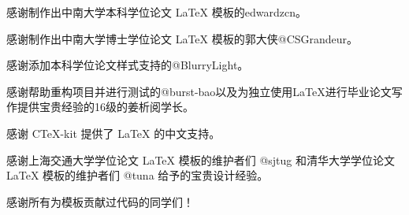 \begin{acknowledgements} 

感谢制作出中南大学本科学位论文 LaTeX 模板的edwardzcn。

感谢制作出中南大学博士学位论文 LaTeX 模板的郭大侠@CSGrandeur。

感谢添加本科学位论文样式支持的@BlurryLight。

感谢帮助重构项目并进行测试的@burst-bao以及为独立使用LaTeX进行毕业论文写作提供宝贵经验的16级的姜析阅学长。

感谢 CTeX-kit 提供了 LaTeX 的中文支持。

感谢上海交通大学学位论文 LaTeX 模板的维护者们 @sjtug 和清华大学学位论文 LaTeX 模板的维护者们 @tuna 给予的宝贵设计经验。

感谢所有为模板贡献过代码的同学们！

\end{acknowledgements}